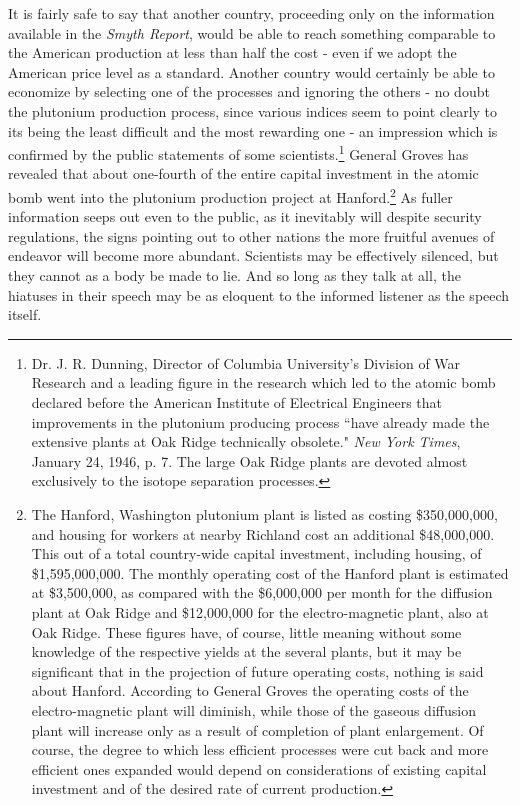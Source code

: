 It is fairly safe to say that another country, proceeding only on the information available in the \emph{Smyth Report}, would be able to reach something comparable to the American production at less than half the cost - even if we adopt the American price level as a standard. Another country would certainly be able to economize by selecting one of the processes and ignoring the others - no doubt the plutonium production process, since various indices seem to point clearly to its being the least difficult and the most rewarding one - an impression which is confirmed by the public statements of some scientists.\footnote{Dr. J. R. Dunning, Director of Columbia University's Division of War Research and a leading figure in the research which led to the atomic bomb declared before the American Institute of Electrical Engineers that improvements in the plutonium producing process ``have already made the extensive plants at Oak Ridge technically obsolete." \textit{New York Times}, January 24, 1946, p. 7. The large Oak Ridge plants are devoted almost exclusively to the isotope separation processes.} General Groves has revealed that about one-fourth of the entire capital investment in the atomic bomb went into the plutonium production project at Hanford.\footnote{The Hanford, Washington plutonium plant is listed as costing \$350,000,000, and housing for workers at nearby Richland cost an additional \$48,000,000. This out of a total country-wide capital investment, including housing, of \$1,595,000,000. The monthly operating cost of the Hanford plant is estimated at \$3,500,000, as compared with the \$6,000,000 per month for the diffusion plant at Oak Ridge and \$12,000,000 for the electro-magnetic plant, also at Oak Ridge. These figures have, of course, little meaning without some knowledge of the respective yields at the several plants, but it may be significant that in the projection of future operating costs, nothing is said about Hanford. According to General Groves the operating costs of the electro-magnetic plant will diminish, while those of the gaseous diffusion plant will increase only as a result of completion of plant enlargement. Of course, the degree to which less efficient processes were cut back and more efficient ones expanded would depend on considerations of existing capital investment and of the desired rate of current production.} As fuller information seeps out even to the public, as it inevitably will despite security regulations, the signs pointing out to other nations the more fruitful avenues of endeavor will become more abundant. Scientists may be effectively silenced, but they cannot as a body be made to lie. And so long as they talk at all, the hiatuses in their speech may be as eloquent to the informed listener as the speech itself.
